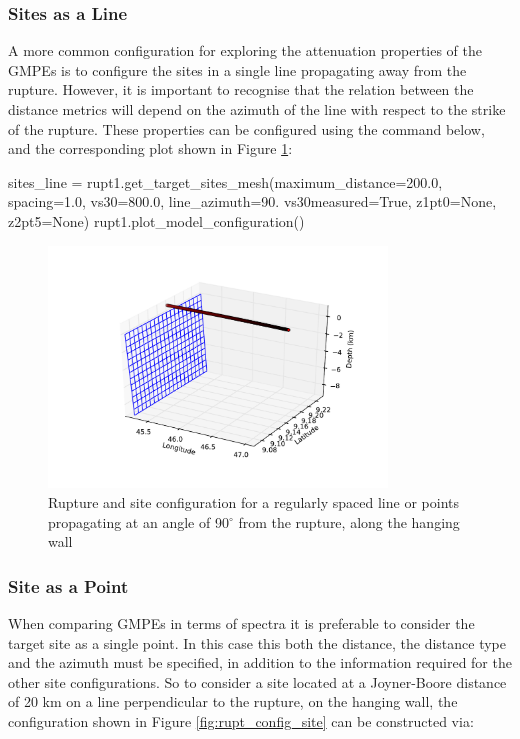 \subsubsection{Sites as a Line}

A more common configuration for exploring the attenuation properties of the GMPEs is to configure the sites in a single line propagating away from the rupture. However, it is important to recognise that the relation between the distance metrics will depend on the azimuth of the line with respect to the strike of the rupture. These properties can be configured using the command below, and the corresponding plot shown in Figure \ref{fig:rupt_config_line}:

\begin{python}
sites_line = rupt1.get_target_sites_mesh(maximum_distance=200.0,
                                         spacing=1.0,
                                         vs30=800.0,
                                         line_azimuth=90.
                                         vs30measured=True,
                                         z1pt0=None,
                                         z2pt5=None)
rupt1.plot_model_configuration()
\end{python}

\begin{figure}[htbp]
	\centering
		\includegraphics[width=9cm]{./figures/trellis/rupt_config_line.pdf}
	\caption{Rupture and site configuration for a regularly spaced line or points propagating at an angle of 90$^{\circ}$ from the rupture, along the hanging wall}
	\label{fig:rupt_config_line}
\end{figure}

\subsubsection{Site as a Point}

When comparing GMPEs in terms of spectra it is preferable to consider the target site as a single point. In this case this both the distance, the distance type and the azimuth must be specified, in addition to the information required for the other site configurations. So to consider a site located at a Joyner-Boore distance of 20 km on a line perpendicular to the rupture, on the hanging wall, the configuration shown in Figure \ref{fig:rupt_config_site} can be constructed via:

